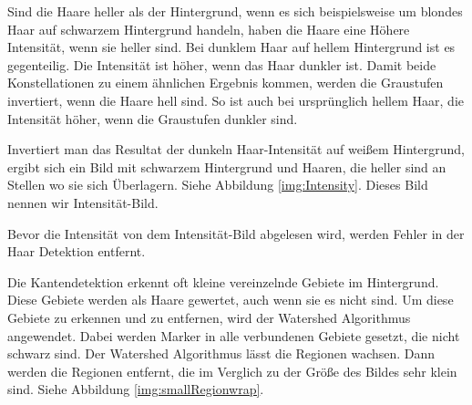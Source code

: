 \documentclass[german,a4paper, 12pt]{llncs}
\begin{document}
Sind die Haare heller als der Hintergrund, wenn es sich beispielsweise um blondes Haar auf schwarzem Hintergrund handeln, haben die Haare eine Höhere Intensität, wenn sie heller sind. Bei dunklem Haar auf hellem Hintergrund ist es gegenteilig. Die Intensität ist höher, wenn das Haar dunkler ist.
Damit beide Konstellationen zu einem ähnlichen Ergebnis kommen, werden die Graustufen invertiert, wenn die Haare hell sind. So ist auch bei ursprünglich hellem Haar, die Intensität höher, wenn die Graustufen dunkler sind.


Invertiert man das Resultat der dunkeln Haar-Intensität auf weißem Hintergrund, ergibt sich ein Bild mit schwarzem Hintergrund und Haaren, die heller sind an Stellen wo sie sich Überlagern. Siehe Abbildung \ref{img:Intensity}. Dieses Bild nennen wir Intensität-Bild.

Bevor die Intensität von dem Intensität-Bild abgelesen wird, werden Fehler in der Haar Detektion entfernt.

Die Kantendetektion erkennt oft kleine vereinzelnde Gebiete im Hintergrund. Diese Gebiete werden als Haare gewertet, auch wenn sie es nicht sind. 
Um diese Gebiete zu erkennen und zu entfernen, wird der Watershed Algorithmus angewendet. Dabei werden Marker in alle verbundenen Gebiete gesetzt, die nicht schwarz sind. Der Watershed Algorithmus lässt die Regionen wachsen. Dann werden die Regionen entfernt, die im Verglich zu der Größe des Bildes sehr klein sind. Siehe Abbildung \ref{img:smallRegionwrap}. \cite{Watershed,WatershedCV,ConnectedComponents}
\end{document}
